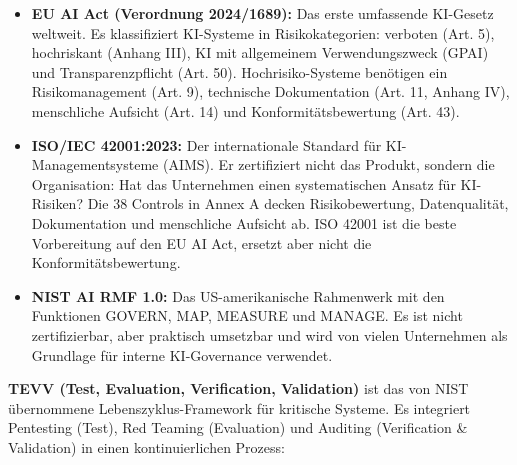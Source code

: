 \begin{itemize}[leftmargin=*]
    \item \textbf{EU AI Act (Verordnung 2024/1689):} Das erste umfassende KI-Gesetz weltweit. Es klassifiziert KI-Systeme in Risikokategorien: verboten (Art. 5), hochriskant (Anhang III), KI mit allgemeinem Verwendungszweck (GPAI) und Transparenzpflicht (Art. 50). Hochrisiko-Systeme benötigen ein Risikomanagement (Art. 9), technische Dokumentation (Art. 11, Anhang IV), menschliche Aufsicht (Art. 14) und Konformitätsbewertung (Art. 43).
    \item \textbf{ISO/IEC 42001:2023:} Der internationale Standard für KI-Managementsysteme (AIMS). Er zertifiziert nicht das Produkt, sondern die Organisation: Hat das Unternehmen einen systematischen Ansatz für KI-Risiken? Die 38 Controls in Annex A decken Risikobewertung, Datenqualität, Dokumentation und menschliche Aufsicht ab. ISO 42001 ist die beste Vorbereitung auf den EU AI Act, ersetzt aber nicht die Konformitätsbewertung.
    \item \textbf{NIST AI RMF 1.0:} Das US-amerikanische Rahmenwerk mit den Funktionen GOVERN, MAP, MEASURE und MANAGE. Es ist nicht zertifizierbar, aber praktisch umsetzbar und wird von vielen Unternehmen als Grundlage für interne KI-Governance verwendet.
\end{itemize}

\textbf{TEVV (Test, Evaluation, Verification, Validation)} ist das von NIST übernommene Lebenszyklus-Framework für kritische Systeme. Es integriert Pentesting (Test), Red Teaming (Evaluation) und Auditing (Verification \& Validation) in einen kontinuierlichen Prozess:

